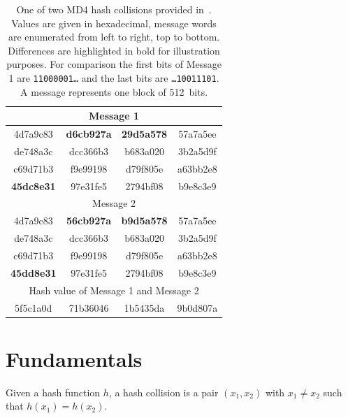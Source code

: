 \begin{table}[bt]
  \begin{center}
    \begin{tabular}{cccc}
      \hline \hline
      \multicolumn{4}{c}{Message 1} \\
      \hline
      4d7a9c83 & \textbf{d6cb927a} & \textbf{29d5a578} & 57a7a5ee \\
      de748a3c & dcc366b3 & b683a020 & 3b2a5d9f \\
      c69d71b3 & f9e99198 & d79f805e & a63bb2e8 \\
      \textbf{45dc8e31} & 97e31fe5 & 2794bf08 & b9e8c3e9 \\
      \hline
      \multicolumn{4}{c}{Message 2} \\
      \hline
      4d7a9c83 & \textbf{56cb927a} & \textbf{b9d5a578} & 57a7a5ee \\
      de748a3c & dcc366b3 & b683a020 & 3b2a5d9f \\
      c69d71b3 & f9e99198 & d79f805e & a63bb2e8 \\
      \textbf{45dd8e31} & 97e31fe5 & 2794bf08 & b9e8c3e9 \\
      \hline
      \multicolumn{4}{c}{Hash value of Message 1 and Message 2} \\
      \hline
      5f5c1a0d & 71b36046 & 1b5435da & 9b0d807a \\
      \hline \hline
    \end{tabular}
    \caption[Hexadecimal values of one MD4 collisions given in paper~\cite{wang2004}]{
      One of two MD4 hash collisions provided in~\cite{wang2004}.
      Values are given in hexadecimal, message words are enumerated from
      left to right, top to bottom. Differences are highlighted in
      bold for illustration purposes. For comparison the first bits
      of Message 1 are \texttt{11000001\dots} and the last bits are
      \texttt{\dots10011101}.
      A message represents one block of 512~bits.
    }
    \label{tab:wang-md4-collision1}
  \end{center}
\end{table}

\newpage
\section{Fundamentals}
\label{sec:dc-fundamentals}
%
\begin{defi}
  Given a hash function $h$,
  a hash collision is a pair $(x_1, x_2)$ with $x_1 \neq x_2$ such that
  $h(x_1) = h(x_2)$.
\end{defi}


